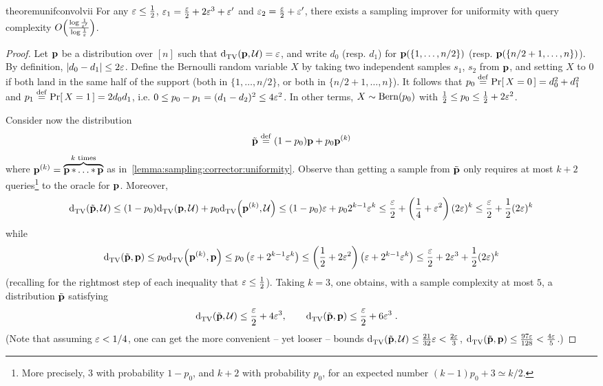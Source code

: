 \begin{restatable}{theorem}{unifconvolvii}\label{lemma:sampling:corrector:uniformity:hybrid}
  For any $\varepsilon\leq \frac{1}{2}$, $\varepsilon_1=\frac{\varepsilon}{2}+2\varepsilon^3+\varepsilon^\prime$ and $\varepsilon_2=\frac{\varepsilon}{2}+\varepsilon^\prime$, there exists a sampling improver for uniformity with query complexity $\bigO{\frac{\log\frac{1}{\eps^\prime}}{\log\frac{1}{\eps}}}$.
\end{restatable}
\begin{proof}
Let $\mathbf{p}$ be a distribution over $[n]$ such that ${\operatorname{d}_{\textrm{TV}}^{}\!\left({\mathbf{p}, \mathcal{U}}\right)} = \varepsilon$, and write $d_0$ (resp. $d_1$) for $\mathbf{p}(\{1,\dots,n/2\})$ (resp. $\mathbf{p}(\{n/2+1,\dots,n\})$). By definition, $\left\lvert d_0-d_1 \right\rvert\leq 2\varepsilon$.
Define the Bernoulli random variable $X$ by taking two independent samples $s_1$, $s_2$ from $\mathbf{p}$, and setting $X$ to $0$ if both land in the same half of the support (both in $\{1,\dots,n/2\}$, or both in $\{n/2+1,\dots,n\}$). It follows that 
$p_0\stackrel{\rm def}{=} \Pr\!\left[\, X=0\, \right] = d_0^2 + d_1^2$ and $p_1\stackrel{\rm def}{=} \Pr\!\left[\, X=1\, \right] = 2d_0d_1$, i.e. $0\leq p_0-p_1 = (d_1-d_2)^2 \leq 4\varepsilon^2$. In other terms, $X\sim \operatorname{Bern}\!\left( p_0 \right)$ with $\frac{1}{2}\leq p_0\leq \frac{1}{2}+2\varepsilon^2$.\medskip

\noindent Consider now the distribution
\[
    \tilde{\D} \eqdef (1-p_0)\D + p_0 \D^{(k)} \vspace{-\baselineskip}
\]
where $\mathbf{p}^{(k)}=\overbrace{\mathbf{p}\operatorname{\ast}\dots\operatorname{\ast} \mathbf{p}}^{k\text{ times}}$ as in~\cref{lemma:sampling:corrector:uniformity}. Observe than getting a sample from $\tilde{\mathbf{p}}$ only requires at most $k+2$ queries\footnote{More precisely, $3$ with probability $1-p_0$, and $k+2$ with probability $p_0$, for an expected number $(k-1)p_0+3\simeq k/2$.} to the oracle for $\mathbf{p}$. Moreover,
\[
  {\operatorname{d}_{\textrm{TV}}^{}\!\left({ \tilde{\mathbf{p}} ,  \mathcal{U} }\right)} \leq (1-p_0){\operatorname{d}_{\textrm{TV}}^{}\!\left({\mathbf{p}, \mathcal{U}}\right)} + p_0 {\operatorname{d}_{\textrm{TV}}^{}\!\left({ \mathbf{p}^{(k)} , \mathcal{U}}\right)} \leq (1-p_0)\varepsilon + p_0 2^{k-1}\varepsilon^k
  \leq \frac{\varepsilon}{2} + \left(\frac{1}{4}+\varepsilon^2\right)(2\varepsilon)^k \leq \frac{\varepsilon}{2} + \frac{1}{2}(2\varepsilon)^k
\]
while
\[
  {\operatorname{d}_{\textrm{TV}}^{}\!\left({ \tilde{\mathbf{p}} , \mathbf{p}}\right)} \leq p_0{\operatorname{d}_{\textrm{TV}}^{}\!\left({ \mathbf{p}^{(k)} , \mathbf{p}}\right)}  \leq p_0\left( \varepsilon+2^{k-1}\varepsilon^k \right)\leq \left(\frac{1}{2}+2\varepsilon^2\right)\left( \varepsilon+2^{k-1}\varepsilon^k \right)
  \leq \frac{\varepsilon}{2} + 2\varepsilon^3 + \frac{1}{2}(2\varepsilon)^k
\]
(recalling for the rightmost step of each inequality that $\varepsilon \leq\frac{1}{2}$). Taking $k=3$, one obtains, with a sample complexity at most $5$, a distribution $\tilde{\mathbf{p}}$ satisfying
\begin{align*}
  {\operatorname{d}_{\textrm{TV}}^{}\!\left({ \tilde{\ensuremath{\mathbf{p}}} ,  \ensuremath{\mathcal{U}}}\right)} &\leq \frac{\varepsilon}{2} + 4\varepsilon^3, \qquad
  {\operatorname{d}_{\textrm{TV}}^{}\!\left({ \tilde{\ensuremath{\mathbf{p}}} , \ensuremath{\mathbf{p}}}\right)} \leq \frac{\varepsilon}{2}+6\varepsilon^3 \;.
\end{align*}
(Note that assuming $\varepsilon < 1/4$, one can get the more convenient -- yet looser -- bounds ${\operatorname{d}_{\textrm{TV}}^{}\!\left({ \tilde{\mathbf{p}} ,  \mathcal{U} }\right)} \leq \frac{21}{32}\varepsilon < \frac{2\varepsilon}{3}$, ${\operatorname{d}_{\textrm{TV}}^{}\!\left({ \tilde{\mathbf{p}} , \mathbf{p}}\right)} \leq \frac{97\varepsilon}{128} < \frac{4\varepsilon}{5}$.)
\end{proof}

